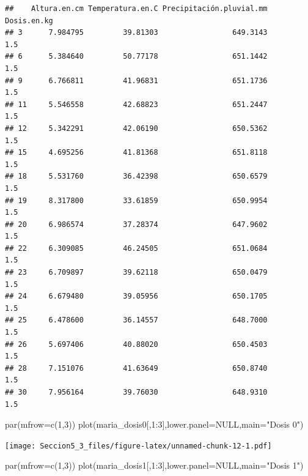 \documentclass[
]{article}
\newenvironment{Shaded}{\begin{snugshade}}{\end{snugshade}}
\newcommand{\AttributeTok}[1]{\textcolor[rgb]{0.77,0.63,0.00}{#1}}
\newcommand{\ConstantTok}[1]{\textcolor[rgb]{0.00,0.00,0.00}{#1}}
\newcommand{\DecValTok}[1]{\textcolor[rgb]{0.00,0.00,0.81}{#1}}
\newcommand{\FunctionTok}[1]{\textcolor[rgb]{0.00,0.00,0.00}{#1}}
\newcommand{\NormalTok}[1]{#1}
\newcommand{\SpecialCharTok}[1]{\textcolor[rgb]{0.00,0.00,0.00}{#1}}
\newcommand{\StringTok}[1]{\textcolor[rgb]{0.31,0.60,0.02}{#1}}
\begin{document}
\begin{verbatim}
##    Altura.en.cm Temperatura.en.C Precipitación.pluvial.mm Dosis.en.kg
## 3      7.984795         39.81303                 649.3143         1.5
## 6      5.384640         50.77178                 651.1442         1.5
## 9      6.766811         41.96831                 651.1736         1.5
## 11     5.546558         42.68823                 651.2447         1.5
## 12     5.342291         42.06190                 650.5362         1.5
## 15     4.695256         41.81368                 651.8118         1.5
## 18     5.531760         36.42398                 650.6579         1.5
## 19     8.317800         33.61859                 650.9954         1.5
## 20     6.986574         37.28374                 647.9602         1.5
## 22     6.309085         46.24505                 651.0684         1.5
## 23     6.709897         39.62118                 650.0479         1.5
## 24     6.679480         39.05956                 650.1705         1.5
## 25     6.478600         36.14557                 648.7000         1.5
## 26     5.697406         40.88020                 650.4503         1.5
## 28     7.151076         41.63649                 650.8740         1.5
## 30     7.956164         39.76030                 648.9310         1.5
\end{verbatim}

\begin{Shaded}
\begin{Highlighting}[]
\FunctionTok{par}\NormalTok{(}\AttributeTok{mfrow=}\FunctionTok{c}\NormalTok{(}\DecValTok{1}\NormalTok{,}\DecValTok{3}\NormalTok{))}
\FunctionTok{plot}\NormalTok{(maria\_dosis0[,}\DecValTok{1}\SpecialCharTok{:}\DecValTok{3}\NormalTok{],}\AttributeTok{lower.panel=}\ConstantTok{NULL}\NormalTok{,}\AttributeTok{main=}\StringTok{"Dosis 0"}\NormalTok{)}
\end{Highlighting}
\end{Shaded}

\texttt{[image: Seccion5\_3\_files/figure-latex/unnamed-chunk-12-1.pdf]}

\begin{Shaded}
\begin{Highlighting}[]
\FunctionTok{par}\NormalTok{(}\AttributeTok{mfrow=}\FunctionTok{c}\NormalTok{(}\DecValTok{1}\NormalTok{,}\DecValTok{3}\NormalTok{))}
\FunctionTok{plot}\NormalTok{(maria\_dosis1[,}\DecValTok{1}\SpecialCharTok{:}\DecValTok{3}\NormalTok{],}\AttributeTok{lower.panel=}\ConstantTok{NULL}\NormalTok{,}\AttributeTok{main=}\StringTok{"Dosis 1"}\NormalTok{)}
\end{Highlighting}
\end{Shaded}
\end{document}
